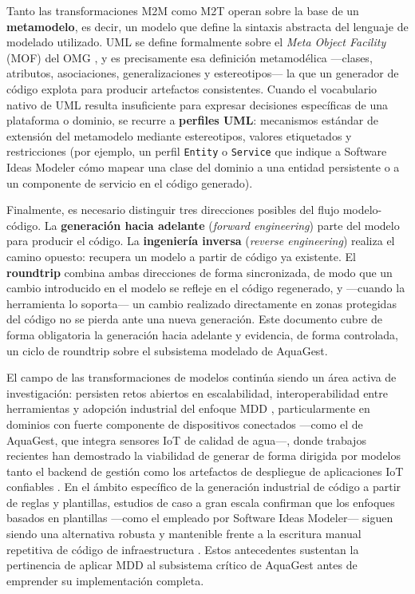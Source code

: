 \documentclass[11pt,a4paper]{article}
\begin{document}
Tanto las transformaciones M2M como M2T operan sobre la base de un \textbf{metamodelo}, es decir, un modelo que define la sintaxis abstracta del lenguaje de modelado utilizado. UML se define formalmente sobre el \emph{Meta Object Facility} (MOF) del OMG \citep{omg_uml2017}, y es precisamente esa definición metamodélica —clases, atributos, asociaciones, generalizaciones y estereotipos— la que un generador de código explota para producir artefactos consistentes. Cuando el vocabulario nativo de UML resulta insuficiente para expresar decisiones específicas de una plataforma o dominio, se recurre a \textbf{perfiles UML}: mecanismos estándar de extensión del metamodelo mediante estereotipos, valores etiquetados y restricciones (por ejemplo, un perfil \texttt{Entity} o \texttt{Service} que indique a Software Ideas Modeler cómo mapear una clase del dominio a una entidad persistente o a un componente de servicio en el código generado).

Finalmente, es necesario distinguir tres direcciones posibles del flujo modelo-código. La \textbf{generación hacia adelante} (\emph{forward engineering}) parte del modelo para producir el código. La \textbf{ingeniería inversa} (\emph{reverse engineering}) realiza el camino opuesto: recupera un modelo a partir de código ya existente. El \textbf{roundtrip} combina ambas direcciones de forma sincronizada, de modo que un cambio introducido en el modelo se refleje en el código regenerado, y —cuando la herramienta lo soporta— un cambio realizado directamente en zonas protegidas del código no se pierda ante una nueva generación. Este documento cubre de forma obligatoria la generación hacia adelante y evidencia, de forma controlada, un ciclo de roundtrip sobre el subsistema modelado de AquaGest.

El campo de las transformaciones de modelos continúa siendo un área activa de investigación: persisten retos abiertos en escalabilidad, interoperabilidad entre herramientas y adopción industrial del enfoque MDD \citep{bucchiarone2020}, particularmente en dominios con fuerte componente de dispositivos conectados —como el de AquaGest, que integra sensores IoT de calidad de agua—, donde trabajos recientes han demostrado la viabilidad de generar de forma dirigida por modelos tanto el backend de gestión como los artefactos de despliegue de aplicaciones IoT confiables \citep{kirchhof2022}. En el ámbito específico de la generación industrial de código a partir de reglas y plantillas, estudios de caso a gran escala confirman que los enfoques basados en plantillas —como el empleado por Software Ideas Modeler— siguen siendo una alternativa robusta y mantenible frente a la escritura manual repetitiva de código de infraestructura \citep{koziolek2020}. Estos antecedentes sustentan la pertinencia de aplicar MDD al subsistema crítico de AquaGest antes de emprender su implementación completa.
\end{document}
